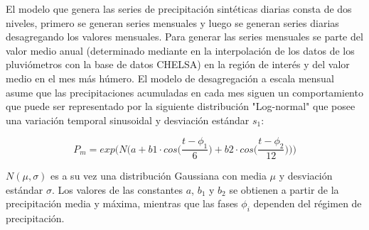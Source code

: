 El modelo que genera las series de precipitación sintéticas diarias consta de dos niveles, 
primero se generan series mensuales y luego se generan series diarias desagregando los valores mensuales.
Para generar las series mensuales se parte del valor medio anual (determinado mediante en la interpolación de los 
datos de los pluviómetros con la base de datos CHELSA) en la región de interés y del valor medio en el 
mes más húmero. El modelo de desagregación a escala mensual asume que las precipitaciones acumuladas en cada mes 
siguen un comportamiento que puede ser representado por la siguiente distribución "Log-normal" 
que posee una variación temporal sinusoidal y desviación estándar $s_1$:

\begin{equation}
    P_m=exp\Bigg(N\bigg(a+b1\cdot cos\bigg(\frac{t-\phi_1}{6}\bigg)+b2\cdot cos\bigg(\frac{t-\phi_2}{12}\bigg)\bigg)\Bigg)
\end{equation}

$N(\mu,\sigma)$ es a su vez una distribución Gaussiana con media $\mu$ y desviación estándar $\sigma$. 
Los valores de las constantes $a$, $b_1$ y $b_2$ se obtienen a partir de la precipitación media y máxima, 
mientras que las fases $\phi_i$ dependen del régimen de precipitación.





